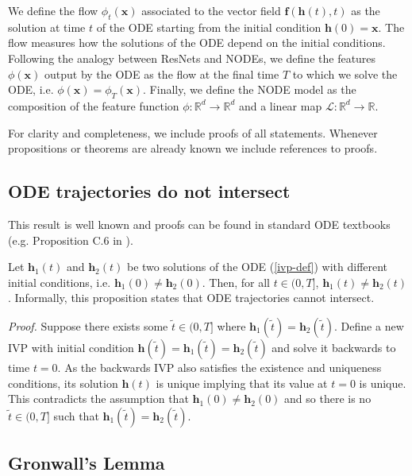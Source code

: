 \documentclass{article}
\begin{document}
We define the flow $\phi_t(\mathbf{x})$ associated to the vector field $\mathbf{f}(\mathbf{h}(t), t)$ as the solution at time $t$ of the ODE starting from the initial condition $\mathbf{h}(0)=\mathbf{x}$. The flow measures how the solutions of the ODE depend on the initial conditions. Following the analogy between ResNets and NODEs, we define the features $\phi(\mathbf{x})$ output by the ODE as the flow at the final time $T$ to which we solve the ODE, i.e. $\phi(\mathbf{x}) = \phi_T(\mathbf{x})$. Finally, we define the NODE model as the composition of the feature function $\phi : \mathbb{R}^d \to \mathbb{R}^d$ and a linear map $\mathcal{L} : \mathbb{R}^d \to \mathbb{R}$.

For clarity and completeness, we include proofs of all statements. Whenever propositions or theorems are already known we include references to proofs.

\subsection{ODE trajectories do not intersect}

This result is well known and proofs can be found in standard ODE textbooks (e.g. Proposition C.6 in \cite{younes2010shapes}).

\begin{prop*} Let $\mathbf{h}_1(t)$ and $\mathbf{h}_2(t)$ be two solutions of the ODE (\ref{ivp-def}) with different initial conditions, i.e. $\mathbf{h}_1(0) \neq \mathbf{h}_2(0)$. Then, for all $t \in (0, T]$, $\mathbf{h}_1(t) \neq \mathbf{h}_2(t)$. Informally, this proposition states that ODE trajectories cannot intersect.
\end{prop*} \label{trajectories-cant-intersect}

\textit{Proof.} Suppose there exists some $\tilde{t} \in (0, T]$ where $\mathbf{h}_1(\tilde{t}) = \mathbf{h}_2(\tilde{t})$. Define a new IVP with initial condition $\mathbf{h}(\tilde{t}) = \mathbf{h}_1(\tilde{t}) = \mathbf{h}_2(\tilde{t})$ and solve it backwards to time $t=0$. As the backwards IVP also satisfies the existence and uniqueness conditions, its solution $\mathbf{h}(t)$ is unique implying that its value at $t=0$ is unique. This contradicts the assumption that $\mathbf{h}_1(0) \neq \mathbf{h}_2(0)$ and so there is no $\tilde{t} \in (0, T]$ such that $\mathbf{h}_1(\tilde{t}) = \mathbf{h}_2(\tilde{t})$.

\subsection{Gronwall's Lemma}
\end{document}
